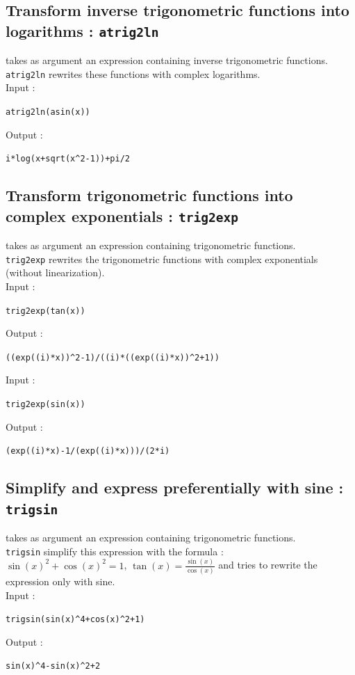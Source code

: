 \documentclass[a4paper,11pt]{book}
\begin{document}
\subsection{Transform inverse trigonometric functions into logarithms : {\tt atrig2ln}}
  takes as argument an expression containing
inverse trigonometric functions.\\
{\tt atrig2ln} rewrites these functions with complex logarithms.\\
Input :
\begin{center}{\tt atrig2ln(asin(x))}\end{center}
Output :
\begin{center}{\tt i*log(x+sqrt(x\verb|^|2-1))+pi/2}\end{center}

\subsection{Transform trigonometric functions into complex exponentials  : {\tt trig2exp}}
 takes as argument an expression containing 
trigonometric functions.\\
{\tt trig2exp} rewrites the trigonometric functions with complex exponentials
({\sc without} linearization).\\ 
Input :
\begin{center}{\tt trig2exp(tan(x))}\end{center}
Output :
\begin{center}{\tt ((exp((i)*x))\verb|^|2-1)/((i)*((exp((i)*x))\verb|^|2+1))}\end{center}
Input :
\begin{center}{\tt trig2exp(sin(x))}\end{center}
Output :
\begin{center}{\tt (exp((i)*x)-1/(exp((i)*x)))/(2*i)}\end{center}

\subsection{Simplify and express preferentially with sine : {\tt trigsin}}
 takes as argument an expression
containing trigonometric functions.\\
{\tt trigsin} simplify this expression with the formula :\\
$\sin(x)^2+\cos(x)^2=1$, $\displaystyle \tan(x)=\frac{\sin(x)}{\cos(x)}$ and 
tries to rewrite the expression only with sine.\\ 
Input :
\begin{center}{\tt trigsin(sin(x)\verb|^|4+cos(x)\verb|^|2+1)}\end{center}
Output :
\begin{center}{\tt sin(x)\verb|^|4-sin(x)\verb|^|2+2}\end{center}
\end{document}

